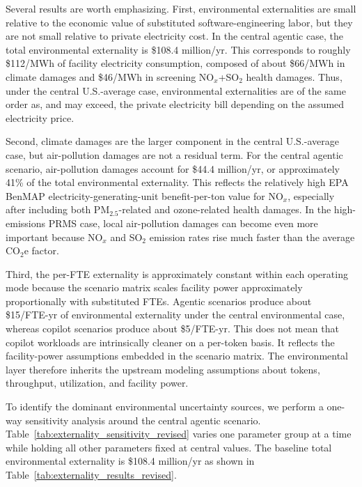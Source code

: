 \documentclass{article}
\begin{document}
Several results are worth emphasizing. First, environmental externalities are small relative to the economic value of substituted software-engineering labor, but they are not small relative to private electricity cost. In the central agentic case, the total environmental externality is \$108.4 million/yr. This corresponds to roughly \$112/MWh of facility electricity consumption, composed of about \$66/MWh in climate
damages and \$46/MWh in screening NO$_x$+SO$_2$ health damages. Thus, under the central U.S.-average case, environmental externalities are of the same order as, and may exceed, the private electricity bill depending on the assumed electricity price.

Second, climate damages are the larger component in the central U.S.-average case, but air-pollution damages are not a residual term. For the central agentic scenario, air-pollution damages account for \$44.4 million/yr, or approximately 41\% of the total environmental externality. This reflects the relatively high EPA BenMAP electricity-generating-unit benefit-per-ton value for NO$_x$, especially after including both PM$_{2.5}$-related and ozone-related health damages. In the high-emissions PRMS case, local air-pollution damages can become even more important because NO$_x$ and SO$_2$ emission rates rise much faster than the average CO$_2$e factor.

Third, the per-FTE externality is approximately constant within each operating mode because the scenario matrix scales facility power approximately proportionally with substituted FTEs. Agentic scenarios produce about \$15/FTE-yr of environmental externality under the central environmental case, whereas copilot scenarios produce about \$5/FTE-yr. This does not mean that copilot workloads are intrinsically cleaner on a per-token basis. It reflects the facility-power assumptions embedded in the scenario matrix. The environmental layer therefore inherits the upstream modeling assumptions about tokens, throughput, utilization, and facility power.

To identify the dominant environmental uncertainty sources, we perform a one-way sensitivity analysis around the central agentic scenario. Table~\ref{tab:externality_sensitivity_revised} varies one parameter group at a time while holding all other parameters fixed at central values. The baseline total environmental externality is \$108.4 million/yr as shown in Table~\ref{tab:externality_results_revised}. 
\end{document}
